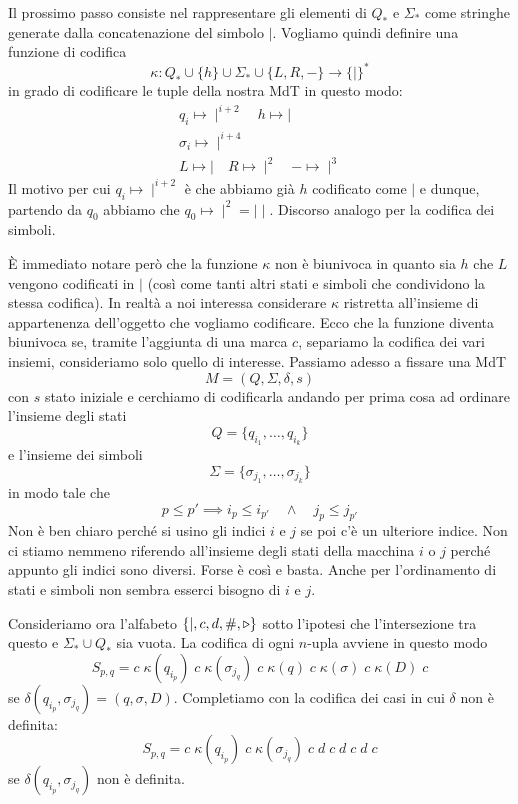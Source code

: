 Il prossimo passo consiste nel rappresentare gli elementi di
$Q_*$ e $\Sigma_*$ come stringhe generate dalla concatenazione
del simbolo $\mid$. Vogliamo quindi definire una funzione di
codifica
\[
	\kappa : Q_* \cup \{ h \} \cup \Sigma_* \cup \{ L, R, - \}
	\rightarrow \{ \mid \}^*
\]
in grado di codificare le tuple della nostra MdT in questo modo:
\begin{gather*}
	q_i \mapsto \mid^{i+2}      \quad h \mapsto \mid \\
	\sigma_i \mapsto \mid^{i+4} \\
	L \mapsto \mid \quad R \mapsto \mid^2 \quad - \mapsto \mid^3
\end{gather*}
Il motivo per cui $q_i \mapsto \mid^{i+2}$ è che abbiamo già $h$
codificato come $\mid$ e dunque, partendo da $q_0$ abbiamo che
$q_0 \mapsto \mid^2 = \mid \mid$. Discorso analogo per la
codifica dei simboli.

\`E immediato notare però che la funzione $\kappa$ non è
biunivoca in quanto sia $h$ che $L$ vengono codificati in $\mid$
(così come tanti altri stati e simboli che condividono la stessa
codifica). In realtà a noi interessa considerare $\kappa$
ristretta all'insieme di appartenenza dell'oggetto che vogliamo
codificare. Ecco che la funzione diventa biunivoca se, tramite
l'aggiunta di una marca $c$, separiamo la codifica dei vari
insiemi, consideriamo solo quello di interesse. Passiamo adesso
a fissare una MdT
\[ M = (Q, \Sigma, \delta, s) \]
con $s$ stato iniziale e cerchiamo di codificarla andando per
prima cosa ad ordinare l'insieme degli stati
\[ Q = \{ q_{i_1}, \dots, q_{i_k} \} \]
e l'insieme dei simboli
\[ \Sigma = \{ \sigma_{j_1}, \dots, \sigma_{j_k} \} \]
in modo tale che
\[
	p \leq p' \implies i_p \leq i_{p'} \quad
	\land \quad j_p \leq j_{p'}
\]
Non è ben chiaro perché si usino gli indici $i$ e $j$ se poi c'è
un ulteriore indice. Non ci stiamo nemmeno riferendo all'insieme
degli stati della macchina $i$ o $j$ perché appunto gli indici
sono diversi. Forse è così e basta. Anche per l'ordinamento di
stati e simboli non sembra esserci bisogno di $i$ e $j$.

Consideriamo ora l'alfabeto $\{ \mid, c, d, \#, \triangleright \}$ sotto
l'ipotesi che l'intersezione tra questo e $\Sigma_* \cup Q_*$
sia vuota. La codifica di ogni $n$-upla avviene in questo modo
\[
	S_{p,q} = c \; \kappa (q_{i_p})
	\; c \; \kappa (\sigma_{j_q})
	\; c \; \kappa (q)
	\; c \; \kappa (\sigma)
	\; c \; \kappa (D) \; c
\]
se $\delta (q_{i_p}, \sigma_{j_q}) = (q, \sigma, D)$. Completiamo
con la codifica dei casi in cui $\delta$ non è definita:
\[
	S_{p,q} = c \; \kappa (q_{i_p})
	\; c \; \kappa (\sigma_{j_q})
	\; c \; d \; c \; d \; c \; d \; c
\]
se $\delta(q_{i_p}, \sigma_{j_q})$ non è definita.

